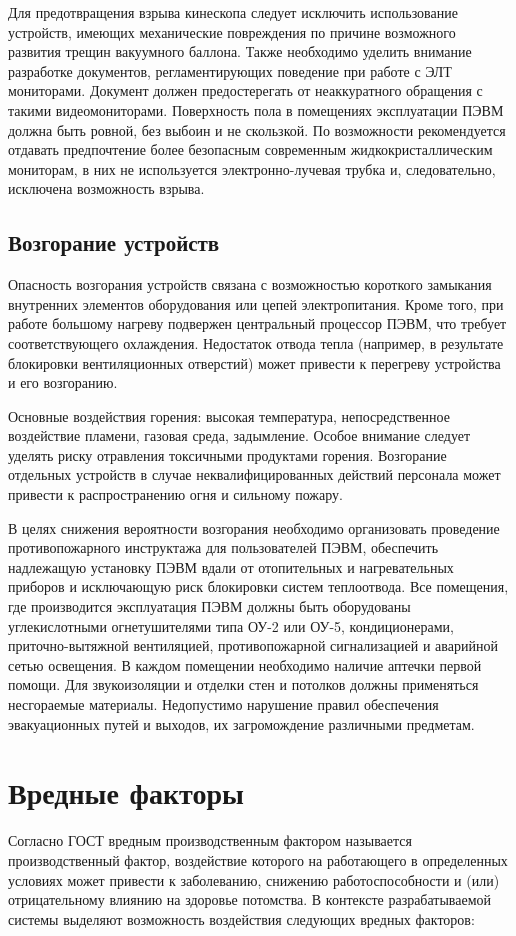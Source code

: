 \documentclass[14pt,oneside,final]{extreport}
\begin{document}
	Для предотвращения взрыва кинескопа следует исключить использование устройств, имеющих механические повреждения по причине возможного развития трещин вакуумного баллона. Также необходимо уделить внимание разработке документов, регламентирующих поведение при работе с ЭЛТ мониторами. Документ должен предостерегать от неаккуратного обращения с такими видеомониторами. Поверхность пола в помещениях эксплуатации ПЭВМ должна быть ровной, без выбоин и не скользкой. По возможности рекомендуется отдавать предпочтение более безопасным современным жидкокристаллическим мониторам, в них не используется электронно-лучевая трубка и, следовательно, исключена возможность взрыва.
	\subsection{Возгорание устройств}
	Опасность возгорания устройств связана с возможностью короткого замыкания внутренних элементов оборудования или цепей электропитания. Кроме того, при работе большому нагреву подвержен центральный процессор ПЭВМ, что требует соответствующего охлаждения. Недостаток отвода тепла (например, в результате блокировки вентиляционных отверстий) может привести к перегреву устройства и его возгоранию.    
	
	Основные воздействия горения: высокая температура, непосредственное воздействие пламени, газовая среда, задымление. Особое внимание следует уделять риску отравления токсичными продуктами горения. Возгорание отдельных устройств в случае неквалифицированных действий персонала может привести к распространению огня и сильному пожару. 
	
	В целях снижения вероятности возгорания необходимо организовать проведение противопожарного инструктажа для пользователей ПЭВМ, обеспечить надлежащую установку ПЭВМ вдали от отопительных и нагревательных приборов и исключающую риск блокировки систем теплоотвода.	Все помещения, где производится эксплуатация ПЭВМ должны быть оборудованы углекислотными огнетушителями  типа \mbox{ОУ-2} или \mbox{ОУ-5}, кондиционерами, приточно-вытяжной вентиляцией, противопожарной сигнализацией и аварийной сетью освещения. В каждом помещении необходимо наличие аптечки первой помощи. Для звукоизоляции и отделки стен и потолков должны применяться несгораемые материалы. Недопустимо нарушение правил обеспечения эвакуационных путей и выходов, их загромождение различными предметам. 
	
	\section{Вредные факторы}
	Согласно ГОСТ \cite{gost:120002} вредным производственным фактором называется производственный фактор, воздействие которого на работающего в определенных условиях может привести к заболеванию, снижению работоспособности и (или) отрицательному влиянию на здоровье потомства. В контексте разрабатываемой системы выделяют возможность воздействия следующих вредных факторов:
	
\end{document}
